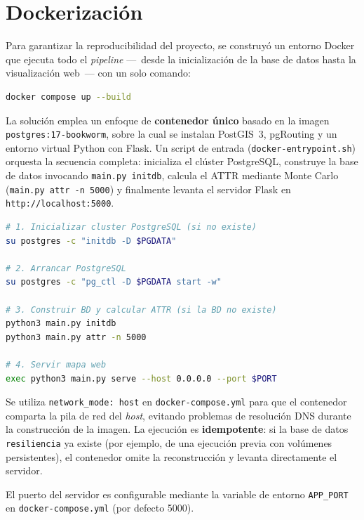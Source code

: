 \documentclass[12pt,a4paper]{article}
\begin{document}
\section{Dockerización}

Para garantizar la reproducibilidad del proyecto, se construyó un entorno
Docker que ejecuta todo el \textit{pipeline} ---~desde la inicialización
de la base de datos hasta la visualización web~--- con un solo comando:

\begin{lstlisting}[language=bash,caption={Ejecución completa con Docker}]
docker compose up --build
\end{lstlisting}

La solución emplea un enfoque de \textbf{contenedor único} basado en la
imagen \texttt{postgres:17-bookworm}, sobre la cual se instalan PostGIS~3,
pgRouting y un entorno virtual Python con Flask.  Un script de entrada
(\texttt{docker-entrypoint.sh}) orquesta la secuencia completa: inicializa
el clúster PostgreSQL, construye la base de datos invocando
\texttt{main.py initdb}, calcula el ATTR mediante Monte Carlo
(\texttt{main.py attr -n 5000}) y finalmente levanta el servidor Flask
en \texttt{http://localhost:5000}.

\begin{lstlisting}[language=bash,caption={Secuencia del entrypoint (docker-entrypoint.sh)}]
# 1. Inicializar cluster PostgreSQL (si no existe)
su postgres -c "initdb -D $PGDATA"

# 2. Arrancar PostgreSQL
su postgres -c "pg_ctl -D $PGDATA start -w"

# 3. Construir BD y calcular ATTR (si la BD no existe)
python3 main.py initdb
python3 main.py attr -n 5000

# 4. Servir mapa web
exec python3 main.py serve --host 0.0.0.0 --port $PORT
\end{lstlisting}

Se utiliza \texttt{network\_mode: host} en \texttt{docker-compose.yml}
para que el contenedor comparta la pila de red del \textit{host},
evitando problemas de resolución DNS durante la construcción de la imagen.
La ejecución es \textbf{idempotente}: si la base de datos
\texttt{resiliencia} ya existe (por ejemplo, de una ejecución previa con
volúmenes persistentes), el contenedor omite la reconstrucción y levanta
directamente el servidor.

El puerto del servidor es configurable mediante la variable de entorno
\texttt{APP\_PORT} en \texttt{docker-compose.yml} (por defecto 5000).
\end{document}
